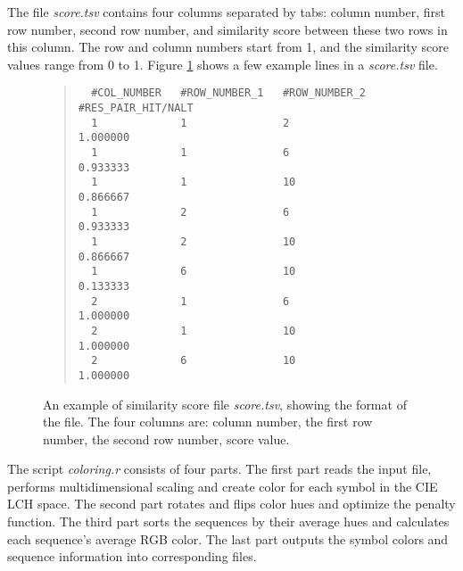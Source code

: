 The file \emph{score.tsv} contains four columns separated by tabs: column number, first row number, second row number, and similarity score between these two rows in this column. The row and column numbers start from 1, and the similarity score values range from 0 to 1. Figure \ref{fig:score.tsv} shows a few example lines in a \emph{score.tsv} file.
\begin{figure}[hb]
\begin{quote}
\begin{verbatim}
  #COL_NUMBER   #ROW_NUMBER_1   #ROW_NUMBER_2   #RES_PAIR_HIT/NALT
  1             1               2               1.000000
  1             1               6               0.933333
  1             1               10              0.866667
  1             2               6               0.933333
  1             2               10              0.866667
  1             6               10              0.133333
  2             1               6               1.000000
  2             1               10              1.000000
  2             6               10              1.000000
\end{verbatim}
\end{quote}
\caption[Example of Similarity Score File]{An example of similarity score file \emph{score.tsv}, showing the format of the file. The four columns are: column number, the first row number, the second row number, score value.}\label{fig:score.tsv}
\end{figure}

The script \emph{coloring.r} consists of four parts. The first part reads the input file, performs multidimensional scaling and create color for each symbol in the CIE LCH space. The second part rotates and flips color hues and optimize the penalty function. The third part sorts the sequences by their average hues and calculates each sequence’s average RGB color. The last part outputs the symbol colors and sequence information into corresponding files.

